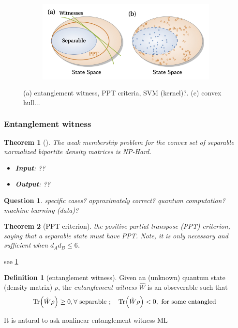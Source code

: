 \documentclass[
aps,
pra,
linenumbers,
floatfix,
]{revtex4-2}
\theoremstyle{plain}
\newtheorem{theorem}{Theorem}
\newtheorem{question}{Question}
\theoremstyle{definition}
\newtheorem{definition}{Definition}
\newcommand{\ew}{\hat{W}}
\newcommand{\dm}{\rho}
\begin{document}
\begin{figure}[!ht]
\begin{subfigure}{0.3\textwidth}
	\end{subfigure}
	\begin{subfigure}{0.3\textwidth}
		\centering
		\includegraphics[width=.9\linewidth]{ppt.jpg}
	\end{subfigure}
	\caption{(a) entanglement witness, PPT criteria, SVM (kernel)?. (c) convex hull... }
	\label{fig:entangle}
\end{figure}

\subsubsection{Entanglement witness}\label{sec:entanglement_witness}
\begin{theorem}[\cite{gurvitsClassicalDeterministicComplexity2003}]
	The weak membership problem for the convex set of separable normalized bipartite density matrices is NP-Hard.
	\begin{itemize}
		\item \textbf{Input}: ??
		\item \textbf{Output}: ??
	\end{itemize}
\end{theorem}
\begin{question}
	specific cases? approximately correct? quantum computation? machine learning (data)?
\end{question}

\begin{theorem}[PPT criterion]
	the positive partial transpose (PPT) criterion, saying that a separable state must have PPT.
	Note, it is only necessary and sufficient when $d_A d_B \le 6$.
\end{theorem}
see \cref{fig:entangle}
\begin{definition}[entanglement witness]\label{def:entanglement_witness}
	Given an (unknown) quantum state (density matrix) $\dm$, the \emph{entanglement witness} $\ew$ is an obseverable such that
	\begin{equation}
		\Tr(\ew\dm) \ge 0 , \forall \text{ separable };\quad
		\Tr(\ew\dm) < 0 , \text{ for some entangled }
	\end{equation}
\end{definition}
It is natural to ask nonlinear entanglement witness \cite{guhneNonlinearEntanglementWitnesses2006}  
 ML
\end{document}
